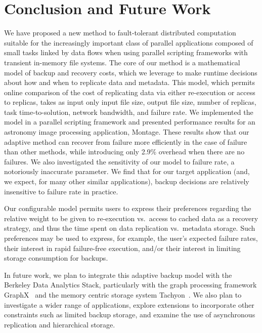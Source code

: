 \documentclass{sig-alternate}
\newcommand{\zhaonote}[1]{{\textcolor{cyan}    { ***Zhao:      #1 }}}
\newcommand{\zhaonote}[1]{}
\begin{document}
\section{Conclusion and Future Work}
\label{sec:Con}
We have proposed a new method to fault-tolerant distributed computation suitable for the increasingly important class of parallel applications composed of small tasks linked by data flows when using parallel scripting frameworks with transient in-memory file systems. %
The core of our method is a mathematical model of backup and recovery costs, which we leverage to make runtime decisions about how and when to replicate data and metadata. This model, which permits online comparison of the cost of replicating data via either re-execution or access to replicas, takes as input only input file size, output file size, number of replicas, task time-to-solution, network bandwidth, and failure rate.
We implemented the model in a parallel scripting framework and presented performance results for an astronomy image processing application, Montage.
These results show that our adaptive method can recover from failure more efficiently in the case of failure than other methods, while introducing only 2.9\% overhead when there are no failures. We also investigated the sensitivity of our model to failure rate, a notoriously inaccurate parameter. We find that for our target application (and, we expect, for many other similar applications), backup decisions are relatively insensitive to failure rate in practice.

Our configurable model permits users to express their preferences regarding the relative weight to be given to re-execution vs.\ access to cached data as a recovery strategy,
and thus the time spent on data replication vs.\ metadata storage. Such preferences may be used to express, for example, the user's expected failure rates, their interest
in rapid failure-free execution, and/or their interest in limiting storage consumption for backups.

In future work, we plan to integrate this adaptive backup model with the Berkeley Data Analytics Stack, particularly with
the graph processing framework GraphX~\cite{graphx2014} and the memory centric storage system Tachyon~\cite{tachyon2014}.
We also plan to investigate a wider range of applications, explore extensions to incorporate other constraints such as limited backup storage,
and examine the use of asynchronous replication and hierarchical storage.
\end{document}
